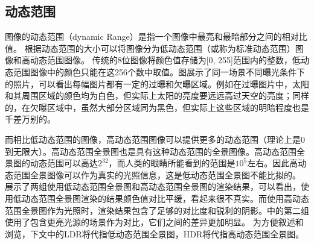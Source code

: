 \subsection{动态范围}
图像的动态范围（dynamic Range）是指一个图像中最亮和最暗部分之间的相对比值\cite{wikipedia}。
根据动态范围的大小可以将图像分为低动态范围（或称为标准动态范围）图像和高动态范围图像。
传统的8位图像将颜色值存储为[0, 255]范围内的整数，低动态范围图像中的颜色只能在这256个数中取值。图展示了同一场景不同曝光条件下的照片，可以看出每幅图片都有一定的过曝和欠曝区域。例如在过曝图片中，太阳和其周围区域的颜色均为白色，但实际上太阳的亮度要远远高过天空的亮度；同样的，在欠曝区域中，虽然大部分区域同为黑色，但实际上这些区域的明暗程度也是千差万别的。

而相比低动态范围的图像，高动态范围图像可以提供更多的动态范围（理论上是0到无限大）。高动态范围全景图也是具有这种动态范围的全景图像。高动态范围全景图的动态范围可以高达$2^{32}$，而人类的眼睛所能看到的范围是$10^5$左右\cite{wikipedia}。因此高动态范围全景图像可以作为真实的光照信息，这是低动态范围全景图不能比拟的。
展示了两组使用低动态范围全景图和高动态范围全景图的渲染结果，可以看出，使用低动态范围全景图渲染的结果颜色值对比平缓，看起来很不真实。而使用高动态范围全景图作为光照时，渲染结果包含了足够的对比度和锐利的阴影。中的第二组使用了包含更亮光源的场景作为对比，它们之间的差异更加明显。
为方便叙述和浏览，下文中的LDR将代指低动态范围全景图，HDR将代指高动态范围全景图。

